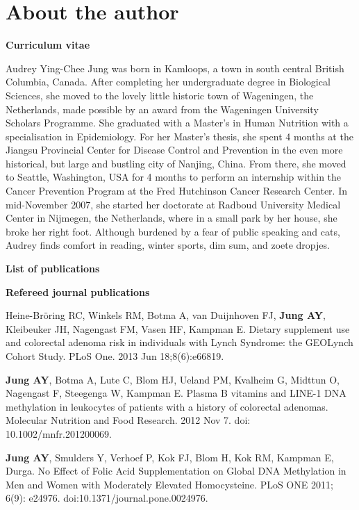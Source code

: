 \chapter*{About the author}
\label{About the author}

\newpage

\noindent \textbf{Curriculum vitae}

\noindent Audrey Ying-Chee Jung was born in Kamloops, a town in south central British Columbia, Canada. After completing her undergraduate degree in Biological Sciences, she moved to the lovely little historic town of Wageningen, the Netherlands, made possible by an award from the Wageningen University Scholars Programme. She graduated with a Master's in Human Nutrition with a specialisation in Epidemiology. For her Master's thesis, she spent 4 months at the Jiangsu Provincial Center for Disease Control and Prevention in the even more historical, but large and bustling city of Nanjing, China. From there, she moved to Seattle, Washington, USA for 4 months to perform an internship within the Cancer Prevention Program at the Fred Hutchinson Cancer Research Center. In mid-November 2007, she started her doctorate at Radboud University Medical Center in Nijmegen, the Netherlands, where in a small park by her house, she broke her right foot. Although burdened by a fear of public speaking and cats, Audrey finds comfort in reading, winter sports, dim sum, and zoete dropjes.


\noindent \textbf{List of publications}

\noindent \textbf{Refereed journal publications}

\noindent Heine-Br\"oring RC, Winkels RM, Botma A, van Duijnhoven FJ, \textbf{Jung AY}, Kleibeuker JH, Nagengast FM, Vasen HF, Kampman E. Dietary supplement use and colorectal adenoma risk in individuals with Lynch Syndrome: the GEOLynch Cohort Study. PLoS One. 2013 Jun 18;8(6):e66819.

\noindent \textbf{Jung AY}, Botma A, Lute C, Blom HJ, Ueland PM, Kvalheim G, Midttun O, Nagengast F, Steegenga W, Kampman E. Plasma B vitamins and LINE-1 DNA methylation in leukocytes of patients with a history of colorectal adenomas. Molecular Nutrition and Food Research. 2012 Nov 7. doi: 10.1002/mnfr.201200069.

\noindent \textbf{Jung AY}, Smulders Y, Verhoef P, Kok FJ, Blom H, Kok RM, Kampman E, Durga. No Effect of Folic Acid Supplementation on Global DNA Methylation in Men and Women with Moderately Elevated Homocysteine. PLoS ONE 2011; 6(9): e24976. doi:10.1371/journal.pone.0024976.

